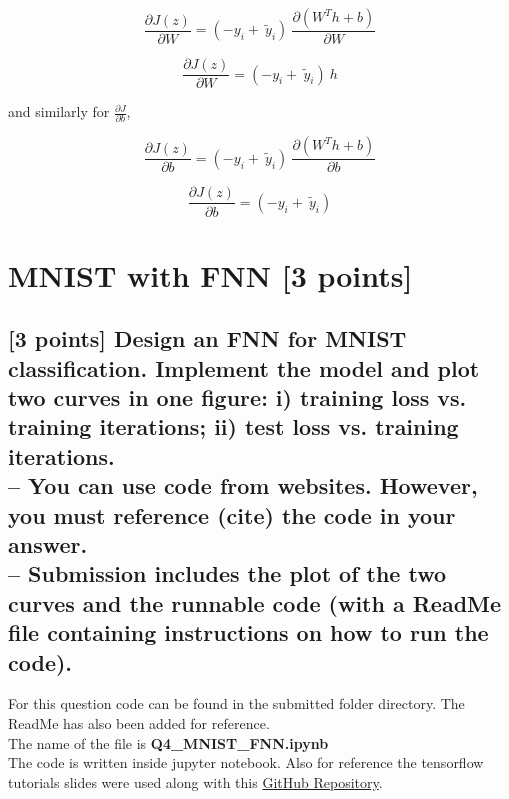 $$ \frac{\partial J(z)}{\partial W}  =   (-y_i + \ \widetilde{y}_i)\ \frac{\partial (W^T h + b)}{\partial W} $$


$$ \frac{\partial J(z)}{\partial W}  =   (-y_i + \ \widetilde{y}_i) \ h $$

and similarly for $ \frac{\partial J}{\partial b} $, 

$$ \frac{\partial J(z)}{\partial b}  =   (-y_i + \ \widetilde{y}_i)\ \frac{\partial (W^T h + b)}{\partial b} $$

$$ \frac{\partial J(z)}{\partial b}  =   (-y_i + \ \widetilde{y}_i) $$

\section{MNIST with FNN [3 points]}

\subsection{[3 points] Design an FNN for MNIST classification. Implement the model and plot
two curves in one figure: i) training loss vs. training iterations; ii) test loss vs. training
iterations.\\
– You can use code from websites. However, you must reference (cite) the code in
your answer.\\
– Submission includes the plot of the two curves and the runnable code (with a
ReadMe file containing instructions on how to run the code).}

For this question code can be found in the submitted folder directory. 
The ReadMe has also been added for reference. \\
The name of the file is \textbf{Q4\_MNIST\_FNN.ipynb}\\
The code is written inside jupyter notebook. Also for reference the tensorflow tutorials slides were used along with this \href{https://github.com/aymericdamien/TensorFlow-Examples/blob/master/examples/3_NeuralNetworks/multilayer_perceptron.py}{GitHub Repository}. 




